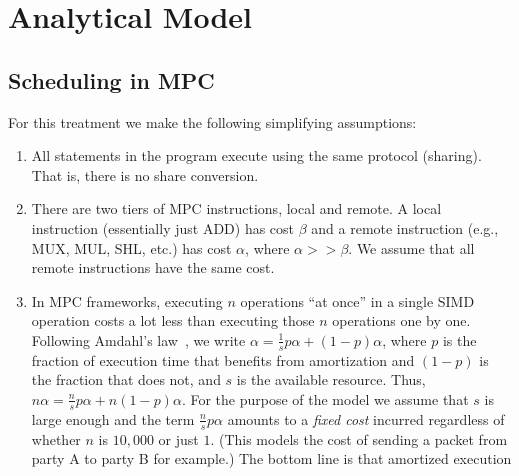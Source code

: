 \section{Analytical Model}
\label{sec:model}


\subsection{Scheduling in MPC}
\label{sec:mpc}


For this treatment we make the following simplifying assumptions:

\begin{enumerate}
\item All statements in the program execute using the same protocol (sharing). That is, there is no share conversion.
\item There are two tiers of MPC instructions, local and remote. A local instruction (essentially just ADD) has cost $\beta$
and a remote instruction (e.g., MUX, MUL, SHL, etc.) has cost $\alpha$, where $\alpha >> \beta$. We assume that all remote
instructions have the same cost.
\item  In MPC frameworks, executing $n$ operations ``at once'' in a single SIMD operation costs a lot less than executing those $n$ operations one by one.
Following Amdahl's law~, we write $\alpha = \frac{1}{s}p\alpha + (1-p)\alpha$, where $p$ is the fraction of execution time that benefits from amortization and $(1-p)$
is the fraction that does not, and $s$ is the available resource. Thus, $n\alpha = \frac{n}{s}p\alpha + n(1-p)\alpha$.
For the purpose of the model we assume that $s$ is large enough and the term $\frac{n}{s}p\alpha$ amounts to a \emph{fixed cost} incurred regardless of
whether $n$ is $10,000$ or just $1$. (This models the cost of sending a packet from party A to party B for example.) The bottom line is that amortized execution

\end{enumerate}
